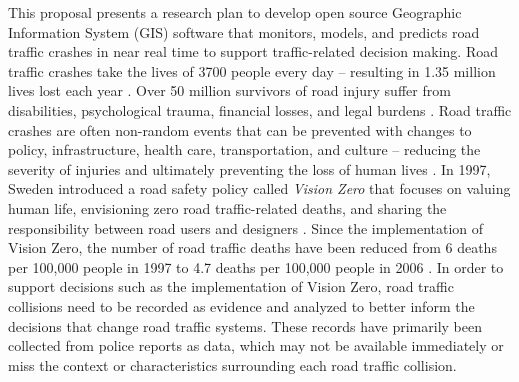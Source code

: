 
This proposal presents a research plan to develop open source Geographic Information System (GIS) software that monitors, models, and predicts road traffic crashes in near real time to support traffic-related decision making. Road traffic crashes take the lives of 3700 people every day -- resulting in 1.35 million lives lost each year \cite{who2018roadsafetyreport}. Over 50 million survivors of road injury suffer from disabilities, psychological trauma, financial losses, and legal burdens \cite{who2016postcrashresponse}. Road traffic crashes are often non-random events that can be prevented with changes to policy, infrastructure, health care, transportation, and culture -- reducing the severity of injuries and ultimately preventing the loss of human lives \cite{bonilla2014injuriesnotaccidents, who2017savelives}. In 1997, Sweden introduced a road safety policy called \textit{Vision Zero} that focuses on valuing human life, envisioning zero road traffic-related deaths, and sharing the responsibility between road users and designers \cite{belin2012visionzero}. Since the implementation of Vision Zero, the number of road traffic deaths have been reduced from 6 deaths per 100,000 people in 1997 to 4.7 deaths per 100,000 people in 2006 \cite{johansson2009visionzero}. In order to support decisions such as the implementation of Vision Zero, road traffic collisions need to be recorded as evidence and analyzed to better inform the decisions that change road traffic systems. These records have primarily been collected from police reports as data, which may not be available immediately or miss the context or characteristics surrounding each road traffic collision.
